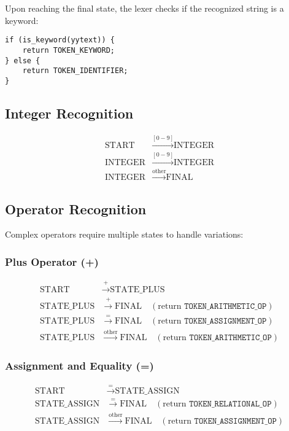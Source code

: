 \documentclass[12pt,a4paper]{article}
\begin{document}
Upon reaching the final state, the lexer checks if the recognized string is a keyword:
\begin{lstlisting}
if (is_keyword(yytext)) {
    return TOKEN_KEYWORD;
} else {
    return TOKEN_IDENTIFIER;
}
\end{lstlisting}

\subsection{Integer Recognition}
\begin{align}
\text{START} &\xrightarrow{[0-9]} \text{INTEGER} \\
\text{INTEGER} &\xrightarrow{[0-9]} \text{INTEGER} \\
\text{INTEGER} &\xrightarrow{\text{other}} \text{FINAL}
\end{align}

\subsection{Operator Recognition}
Complex operators require multiple states to handle variations:

\subsubsection{Plus Operator (+)}
\begin{align}
\text{START} &\xrightarrow{+} \text{STATE\_PLUS} \\
\text{STATE\_PLUS} &\xrightarrow{+} \text{FINAL} \quad (\text{return } \texttt{TOKEN\_ARITHMETIC\_OP}) \\
\text{STATE\_PLUS} &\xrightarrow{=} \text{FINAL} \quad (\text{return } \texttt{TOKEN\_ASSIGNMENT\_OP}) \\
\text{STATE\_PLUS} &\xrightarrow{\text{other}} \text{FINAL} \quad (\text{return } \texttt{TOKEN\_ARITHMETIC\_OP})
\end{align}

\subsubsection{Assignment and Equality (=)}
\begin{align}
\text{START} &\xrightarrow{=} \text{STATE\_ASSIGN} \\
\text{STATE\_ASSIGN} &\xrightarrow{=} \text{FINAL} \quad (\text{return } \texttt{TOKEN\_RELATIONAL\_OP}) \\
\text{STATE\_ASSIGN} &\xrightarrow{\text{other}} \text{FINAL} \quad (\text{return } \texttt{TOKEN\_ASSIGNMENT\_OP})
\end{align}
\end{document}
